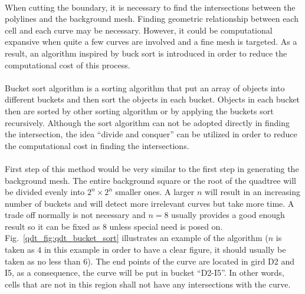 \paragraph{}
When cutting the boundary, it is necessary to find the intersections between the polylines and the background mesh.
Finding geometric relationship between each cell and each curve may be necessary.
However, it could be computational expansive when quite a few curves are involved and a fine mesh is targeted.
As a result, an algorithm inspired by buck sort is introduced in order to reduce the computational cost of this process.
\paragraph{}
Bucket sort algorithm is a sorting algorithm that put an array of objects into different buckets and then sort the objects in each bucket.
Objects in each bucket then are sorted by other sorting algorithm or by applying the buckets sort recursively.
Although the sort algorithm can not be adopted directly in finding the intersection, the idea ``divide and conquer'' can be utilized in order to reduce the computational cost in finding the intersections.
\paragraph{}
First step of this method would be very similar to the first step in generating the background mesh.
The entire background square or the root of the quadtree will be divided evenly into $2^n \times 2^n$ smaller ones.
A larger $n$ will result in an increasing number of buckets and will detect more irrelevant curves but take more time.
A trade off normally is not necessary and $n=8$ usually provides a good enough result so it can be fixed as $8$ unless special need is posed on.
Fig.~\ref{qdt_fig:qdt_bucket_sort} illustrates an example of the algorithm ($n$ is taken as $4$ in this example in order to have a clear figure, it should usually be taken as no less than $6$).
The end points of the curve are located in gird D2 and I5, as a consequence, the curve will be put in bucket ``D2-I5''.
In other words, cells that are not in this region shall not have any intersections with the curve.

